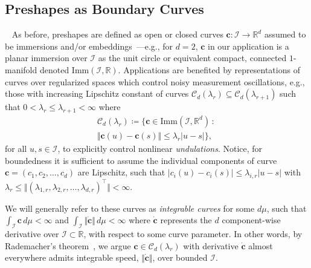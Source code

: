 \documentclass[pdflatex,iicol]{sn-jnl}%
\theoremstyle{thmstyleone}%
\theoremstyle{thmstyletwo}%
\theoremstyle{thmstylethree}%
\begin{document}
\subsection{Preshapes as Boundary Curves}~\label{subsec:preshapes}
As before, preshapes are defined as open or closed curves $\boldsymbol{c}:\mathcal{I} \rightarrow \mathbb{R}^d$ assumed to be immersions and/or embeddings~\cite{micheli2013matrix,bauer2014overview,srivastava2010shape,mumford2006riemannian,younes2008metric,hartman2023elastic}---e.g., for $d=2$, $\boldsymbol{c}$ in our application is a planar immersion over $\mathcal{I}$ as the unit circle or equivalent compact, connected $1$-manifold denoted $\text{Imm}(\mathcal{I}, \mathbb{R})$. Applications are benefited by representations of curves over regularized spaces which control noisy measurement oscillations, e.g., those with increasing Lipschitz constant of curves $\mathcal{C}_d(\lambda_r) \subseteq \mathcal{C}_d(\lambda_{r+1})$ such that $0<\lambda_r \leq \lambda_{r+1}<\infty$ where
        \begin{multline}\label{eq:reg_Hilbert_space}
             \mathcal{C}_d(\lambda_r) \coloneqq
             \lbrace \boldsymbol{c} \in \text{Imm}(\mathcal{I},\mathbb{R}^d) \,:\,\\ \Vert \boldsymbol{c}(u) - \boldsymbol{c}(s)\Vert \leq \lambda_r\vert u - s\vert\rbrace,
        \end{multline}
for all $u,s\in \mathcal{I}$, to explicitly control nonlinear \emph{undulations}. Notice, for boundedness it is sufficient to assume the individual components of curve $\boldsymbol{c} = (c_1, c_2, \dots, c_d)$ are Lipschitz, such that $\vert c_i(u) - c_i(s) \vert \leq \lambda_{i,r}\vert u - s\vert$ with $\lambda_r \leq \Vert (\lambda_{1,r}, \lambda_{2,r},\dots, \lambda_{d,r})^\top\Vert <\infty$.

We will generally refer to these curves as \emph{integrable curves} for some $d\mu$, such that $\int_{\mathcal{I}} \boldsymbol{c} \,d\mu < \infty$ and $\int_{\mathcal{I}} \Vert \dot{\boldsymbol{c}} \Vert\, d\mu < \infty$ where $\dot{\boldsymbol{c}}$ represents the $d$ component-wise derivative over $\mathcal{I} \subset \mathbb{R}$, with respect to some curve parameter. In other words, by Rademacher's theorem~\cite{rudin1987real}, we argue $\boldsymbol{c} \in \mathcal{C}_d(\lambda_r)$ with derivative $\dot{\boldsymbol{c}}$ almost everywhere admits integrable speed, $\Vert \dot{\boldsymbol{c}}\Vert$, over bounded $\mathcal{I}$.
\end{document}
